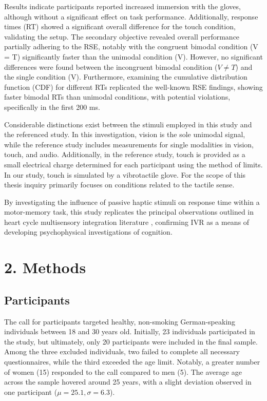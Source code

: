 \documentclass[12pt,oneside,openright]{report}
\begin{document}
Results indicate participants reported increased immersion with the gloves, although without a significant effect on task performance. Additionally, response times (RT) showed a significant overall difference for the touch condition, validating the setup. The secondary objective revealed overall performance partially adhering to the RSE, notably with the congruent bimodal condition (V = T) significantly faster than the unimodal condition (V). However, no significant differences were found between the incongruent bimodal condition ($V \neq T$) and the single condition (V). Furthermore, examining the cumulative distribution function (CDF) for different RTs replicated the well-known RSE findings, showing faster bimodal RTs than unimodal conditions, with potential violations, specifically in the first 200 ms.

Considerable distinctions exist between the stimuli employed in this study and the referenced study. In this investigation, vision is the sole unimodal signal, while the reference study includes measurements for single modalities in vision, touch, and audio. Additionally, in the reference study, touch is provided as a small electrical charge determined for each participant using the method of limits. In our study, touch is simulated by a vibrotactile glove. For the scope of this thesis inquiry primarily focuses on conditions related to the tactile sense.

By investigating the influence of passive haptic stimuli on response time within a motor-memory task, this study replicates the principal observations outlined in heart cycle multisensory integration literature \parencite{SALTAFOSSI2023108642}, confirming IVR as a means of developing psychophysical investigations of cognition.

\section*{2. Methods}
\subsection*{Participants}
The call for participants targeted healthy, non-smoking German-speaking individuals between 18 and 30 years old. Initially, 23 individuals participated in the study, but ultimately, only 20 participants were included in the final sample. Among the three excluded individuals, two failed to complete all necessary questionnaires, while the third exceeded the age limit. Notably, a greater number of women (15) responded to the call compared to men (5). The average age across the sample hovered around 25 years, with a slight deviation observed in one participant ($\mu=25.1, \sigma=6.3$).
\end{document}
